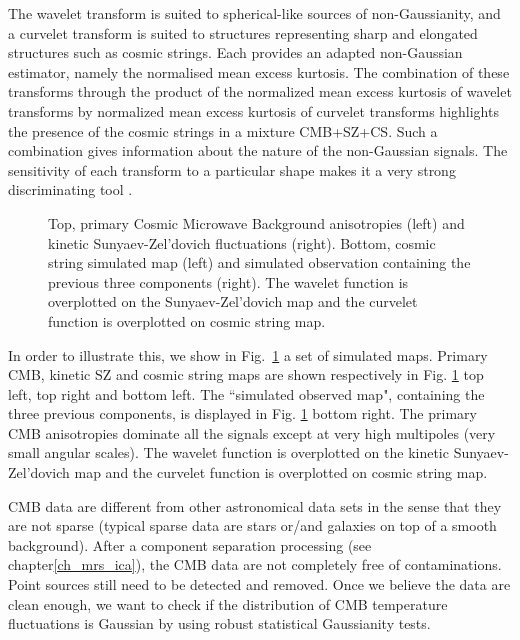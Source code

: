 The wavelet transform is suited to spherical-like sources of non-Gaussianity, and a curvelet transform is suited to structures 
representing sharp and elongated structures such as cosmic strings. Each provides an adapted non-Gaussian estimator, namely 
the normalised mean excess kurtosis. The combination of these transforms through the product of the normalized mean excess kurtosis 
of wavelet transforms by normalized mean excess kurtosis of curvelet transforms highlights the presence of the cosmic strings 
in a mixture CMB+SZ+CS. Such a combination gives information about the nature of the non-Gaussian signals. The sensitivity of 
each transform to a particular shape makes it a very strong discriminating tool \cite{starck:sta03_1,starck:jin05}.

\begin{figure}[htb]
\centerline{
\vbox{
}}
\caption{Top, primary Cosmic Microwave Background anisotropies (left) and kinetic Sunyaev-Zel'dovich fluctuations (right). 
Bottom, cosmic string simulated map (left) and simulated observation containing the previous three components (right). 
The wavelet function is overplotted on the Sunyaev-Zel'dovich map and the curvelet function is overplotted on cosmic string map.}
\label{fig_cmb}
\end{figure}
In order to illustrate this, we show in Fig.~\ref{fig_cmb} a set of simulated maps. Primary CMB, kinetic SZ and cosmic string 
maps are shown respectively in Fig. \ref{fig_cmb} top left, top right and bottom left. The ``simulated observed map", containing 
the three previous components, is displayed in Fig. \ref{fig_cmb} bottom right. The primary CMB anisotropies dominate all the 
signals except at very high multipoles (very small angular scales). The wavelet function is overplotted on the kinetic Sunyaev-Zel'dovich 
map and the curvelet function is overplotted on cosmic string map.


CMB data are different from other astronomical data sets in the sense that they are not sparse (typical sparse data are stars or/and 
galaxies on top of a smooth background). After a component separation processing (see chapter\ref{ch_mrs_ica}), the CMB data are not 
completely free of contaminations. Point sources still need to be detected and removed. Once we believe the data are clean enough, 
we want to check if the distribution of CMB temperature fluctuations is Gaussian by using robust statistical Gaussianity tests. 


